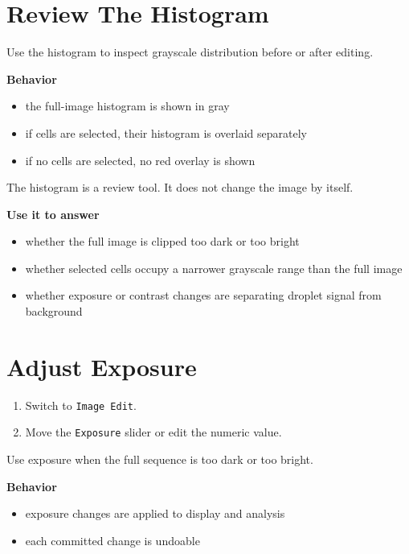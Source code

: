 \documentclass[
  9pt,
  letterpaper,
  oneside,
  open=any,
  DIV=15,
  parskip=half-,
  headings=big,
  numbers=noenddot
]{scrbook}
\newcommand{\manuallead}[1]{%
  \vspace{0.15em}%
  {\sffamily\bfseries\color{ManualBlue}#1}\par\nobreak\vspace{0.05em}%
}
\begin{document}
\section{Review The Histogram}

Use the histogram to inspect grayscale distribution before or after editing.


\manuallead{Behavior}

\begin{itemize}[leftmargin=*,itemsep=0.35em,topsep=0.4em]
\item the full-image histogram is shown in gray
\item if cells are selected, their histogram is overlaid separately
\item if no cells are selected, no red overlay is shown
\end{itemize}

The histogram is a review tool. It does not change the image by itself.


\manuallead{Use it to answer}

\begin{itemize}[leftmargin=*,itemsep=0.35em,topsep=0.4em]
\item whether the full image is clipped too dark or too bright
\item whether selected cells occupy a narrower grayscale range than the full image
\item whether exposure or contrast changes are separating droplet signal from background
\end{itemize}

\section{Adjust Exposure}

\begin{enumerate}[leftmargin=*,itemsep=0.35em,topsep=0.4em]
\item Switch to \texttt{Image Edit}.
\item Move the \texttt{Exposure} slider or edit the numeric value.
\end{enumerate}

Use exposure when the full sequence is too dark or too bright.


\manuallead{Behavior}

\begin{itemize}[leftmargin=*,itemsep=0.35em,topsep=0.4em]
\item exposure changes are applied to display and analysis
\item each committed change is undoable
\end{itemize}
\end{document}
